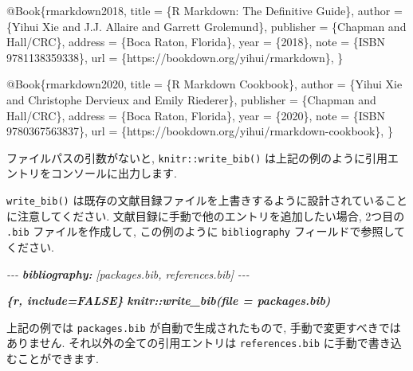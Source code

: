 \documentclass[
  11pt,
]{bxjsreport}
\newenvironment{Shaded}{\begin{snugshade}}{\end{snugshade}}
\newcommand{\AnnotationTok}[1]{\textcolor[rgb]{0.56,0.35,0.01}{\textbf{\textit{#1}}}}
\newcommand{\CommentTok}[1]{\textcolor[rgb]{0.56,0.35,0.01}{\textit{#1}}}
\newcommand{\DataTypeTok}[1]{\textcolor[rgb]{0.13,0.29,0.53}{#1}}
\newcommand{\InformationTok}[1]{\textcolor[rgb]{0.56,0.35,0.01}{\textbf{\textit{#1}}}}
\newcommand{\NormalTok}[1]{#1}
\newcommand{\OtherTok}[1]{\textcolor[rgb]{0.56,0.35,0.01}{#1}}
\newcommand{\VariableTok}[1]{\textcolor[rgb]{0.00,0.00,0.00}{#1}}
\begin{document}
\begin{Shaded}
\begin{Highlighting}[]
\VariableTok{@Book}\NormalTok{\{}\OtherTok{rmarkdown2018}\NormalTok{,}
  \DataTypeTok{title}\NormalTok{ = \{R Markdown: The Definitive Guide\},}
  \DataTypeTok{author}\NormalTok{ = \{Yihui Xie and J.J. Allaire and Garrett}
\NormalTok{    Grolemund\},}
  \DataTypeTok{publisher}\NormalTok{ = \{Chapman and Hall/CRC\},}
  \DataTypeTok{address}\NormalTok{ = \{Boca Raton, Florida\},}
  \DataTypeTok{year}\NormalTok{ = \{2018\},}
  \DataTypeTok{note}\NormalTok{ = \{ISBN 9781138359338\},}
  \DataTypeTok{url}\NormalTok{ = \{https://bookdown.org/yihui/rmarkdown\},}
\NormalTok{\}}

\VariableTok{@Book}\NormalTok{\{}\OtherTok{rmarkdown2020}\NormalTok{,}
  \DataTypeTok{title}\NormalTok{ = \{R Markdown Cookbook\},}
  \DataTypeTok{author}\NormalTok{ = \{Yihui Xie and Christophe Dervieux and Emily}
\NormalTok{    Riederer\},}
  \DataTypeTok{publisher}\NormalTok{ = \{Chapman and Hall/CRC\},}
  \DataTypeTok{address}\NormalTok{ = \{Boca Raton, Florida\},}
  \DataTypeTok{year}\NormalTok{ = \{2020\},}
  \DataTypeTok{note}\NormalTok{ = \{ISBN 9780367563837\},}
  \DataTypeTok{url}\NormalTok{ = \{https://bookdown.org/yihui/rmarkdown{-}cookbook\},}
\NormalTok{\}}
\end{Highlighting}
\end{Shaded}

ファイルパスの引数がないと, \texttt{knitr::write\_bib()} は上記の例のように引用エントリをコンソールに出力します.

\texttt{write\_bib()} は既存の文献目録ファイルを上書きするように設計されていることに注意してください. 文献目録に手動で他のエントリを追加したい場合, 2つ目の \texttt{.bib} ファイルを作成して, この例のように \texttt{bibliography} フィールドで参照してください.

\begin{Shaded}
\begin{Highlighting}[]
\CommentTok{{-}{-}{-}}
\AnnotationTok{bibliography:}\CommentTok{ [packages.bib, references.bib]}
\CommentTok{{-}{-}{-}}

\InformationTok{\textasciigrave{}\textasciigrave{}\textasciigrave{}\{r, include=FALSE\}}
\InformationTok{knitr::write\_bib(file = \textquotesingle{}packages.bib\textquotesingle{})}
\InformationTok{\textasciigrave{}\textasciigrave{}\textasciigrave{}}
\end{Highlighting}
\end{Shaded}

上記の例では \texttt{packages.bib} が自動で生成されたもので, 手動で変更すべきではありません. それ以外の全ての引用エントリは \texttt{references.bib} に手動で書き込むことができます.
\end{document}
